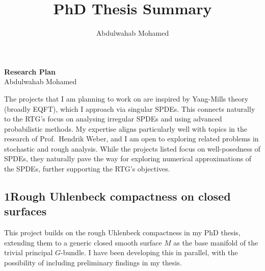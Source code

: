 \documentclass[12pt]{article}
\title{PhD Thesis Summary}
\author{Abdulwahab Mohamed}
\date{}
\numberwithin{equation}{section}
\theoremstyle{definition}
\theoremstyle{remark}
\newcommand{\1}{\mathbf 1}
\newcommand{\<}{\langle}
\renewcommand{\>}{\rangle}
\begin{document}
\vspace{-10pt}
\begin{center}
    {\large \textbf{Research Plan}} \\ \vspace{1pt}
    Abdulwahab Mohamed
\end{center}
%
The projects that I am planning to work on are inspired by Yang-Mills theory (broadly EQFT), which I approach via singular SPDEs. This connects naturally to the RTG's focus on analysing irregular SPDEs and using advanced probabilistic methods. My expertise aligns particularly well with topics in the research of Prof.\ Hendrik Weber, and I am open to exploring related problems in stochastic and rough analysis. While the projects listed focus on well-posedness of SPDEs, they naturally pave the way for exploring numerical approximations of the SPDEs, further supporting the RTG's objectives. 



\subsection*{1\quad Rough Uhlenbeck compactness on closed surfaces}
%
This project builds on the rough Uhlenbeck compactness in my PhD thesis, extending them to a generic closed smooth surface $M$ as the base manifold of the trivial principal $G$-bundle. I have been developing this in parallel, with the possibility of including preliminary findings in my thesis.
\end{document}
